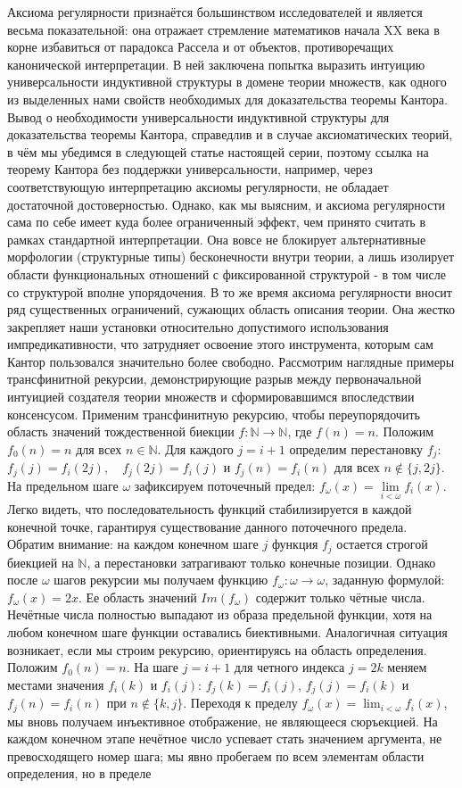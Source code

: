 \documentclass[12pt]{article}
\begin{document}
Аксиома регулярности признаётся большинством исследователей и является весьма показательной: она отражает стремление математиков начала XX века в корне избавиться от парадокса Рассела и от объектов, противоречащих канонической интерпретации. В ней заключена попытка выразить интуицию универсальности индуктивной структуры в домене теории множеств, как одного из выделенных нами свойств необходимых для доказательства теоремы Кантора. Вывод о необходимости универсальности индуктивной структуры для доказательства теоремы Кантора, справедлив и в случае аксиоматических теорий, в чём мы убедимся в следующей статье настоящей серии, поэтому ссылка на теорему Кантора без поддержки универсальности, например, через соответствующую интерпретацию аксиомы регулярности, не обладает достаточной достоверностью. Однако, как мы выясним, и аксиома регулярности сама по себе имеет куда более ограниченный эффект, чем принято считать в рамках стандартной интерпретации. Она вовсе не блокирует альтернативные морфологии (структурные типы) бесконечности внутри теории, а лишь изолирует области функциональных отношений с фиксированной структурой - в том числе со структурой вполне упорядочения. В то же время аксиома регулярности вносит ряд существенных ограничений, сужающих область описания теории. Она жестко закрепляет наши установки относительно допустимого использования импредикативности, что затрудняет освоение этого инструмента, которым сам Кантор пользовался значительно более свободно. Рассмотрим наглядные примеры трансфинитной рекурсии, демонстрирующие разрыв между первоначальной интуицией создателя теории множеств и сформировавшимся впоследствии консенсусом. Применим трансфинитную рекурсию, чтобы переупорядочить область значений тождественной биекции $f : \mathbb{N} \to \mathbb{N}$, где $f(n) = n$. Положим $f_0(n) = n$ для всех $n \in \mathbb{N}$. Для каждого $j = i + 1$ определим перестановку $f_j$: $f_j(j) = f_i(2j), \quad f_j(2j) = f_i(j)$ и $f_j(n) = f_i(n)$ для всех $n \notin \{ j, 2j \}$. На предельном шаге $\omega$ зафиксируем поточечный предел: $f_{\omega}(x) = \lim\limits_{i < \omega} f_i(x)$. Легко видеть, что последовательность функций стабилизируется в каждой конечной точке, гарантируя существование данного поточечного предела. Обратим внимание: на каждом конечном шаге $j$ функция $f_j$ остается строгой биекцией на $\mathbb{N}$, а перестановки затрагивают только конечные позиции. Однако после $\omega$ шагов рекурсии мы получаем функцию $f_{\omega} : \omega \to \omega$, заданную формулой: $f_{\omega}(x) = 2x$. Ее область значений $Im(f_{\omega})$ содержит только чётные числа. Нечётные числа полностью выпадают из образа предельной функции, хотя на любом конечном шаге функции оставались биективными. Аналогичная ситуация возникает, если мы строим рекурсию, ориентируясь на область определения. Положим $f_0(n) = n$. На шаге $j = i + 1$ для четного индекса $j = 2k$ меняем местами значения $f_i(k)$ и $f_i(j)$: $f_j(k) = f_i(j)$, $f_j(j) = f_i(k)$ и $f_j(n) = f_i(n)$ при $n \notin \{ k, j \}$. Переходя к пределу $f_{\omega}(x) = \lim_{i < \omega} f_i(x)$, мы вновь получаем инъективное отображение, не являющееся сюръекцией. На каждом конечном этапе нечётное число успевает стать значением аргумента, не превосходящего номер шага; мы явно пробегаем по всем элементам области определения, но в пределе 
\end{document}
